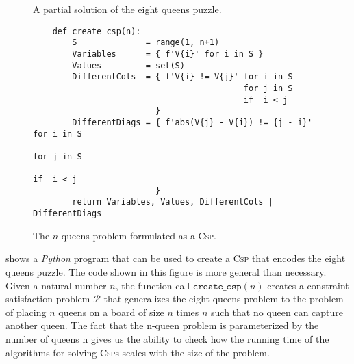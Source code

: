 \begin{figure}[!ht]
  \centering
  \caption{A partial solution of the eight queens puzzle.}
  \label{fig:eight-queens-partial.png}
\end{figure}


\begin{figure}[!ht]
\centering
\begin{verbatim}    
    def create_csp(n):
        S              = range(1, n+1)           
        Variables      = { f'V{i}' for i in S }
        Values         = set(S)
        DifferentCols  = { f'V{i} != V{j}' for i in S
                                           for j in S
                                           if  i < j 
                         }
        DifferentDiags = { f'abs(V{j} - V{i}) != {j - i}' for i in S
                                                          for j in S 
                                                          if  i < j 
                         }
        return Variables, Values, DifferentCols | DifferentDiags
\end{verbatim}
\vspace*{-0.3cm}
\caption{The $n$ queens problem formulated as a \textsc{Csp}.}
\label{fig:N-Queens-Problem-CSP.ipynb}
\end{figure}
\FloatBarrier

 shows a \textsl{Python} program that can be used to create a \textsc{Csp} that
encodes the eight queens puzzle.  The code shown in this figure is more general than necessary.  Given a natural
number $n$, the function call $\texttt{create\_csp}(n)$ creates a constraint satisfaction problem $\mathcal{P}$ that generalizes
the eight queens problem to the problem of placing $n$ queens on a board of size $n$ times $n$ such that no
queen can capture another queen.  The fact that the n-queen problem is parameterized by the number of queens n
gives us the ability to check how the running time of the algorithms for solving \textsc{Csp}s scales with the size
of the problem. 


